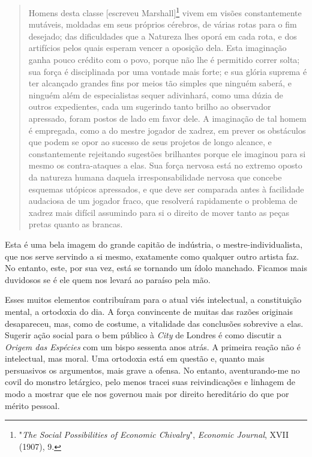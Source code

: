 \documentclass[12pt]{article}
\begin{document}
\begin{quote}
Homens desta classe [escreveu Marshall]\footnote{"\textit{The Social Possibilities of Economic Chivalry}", \textit{Economic Journal}, XVII (1907), 9.} vivem em visões constantemente mutáveis, moldadas em seus próprios cérebros, de várias rotas para o fim desejado; das dificuldades que a Natureza lhes oporá em cada rota, e dos artifícios pelos quais esperam vencer a oposição dela. Esta imaginação ganha pouco crédito com o povo, porque não lhe é permitido correr solta; sua força é disciplinada por uma vontade mais forte; e sua glória suprema é ter alcançado grandes fins por meios tão simples que ninguém saberá, e ninguém além de especialistas sequer adivinhará, como uma dúzia de outros expedientes, cada um sugerindo tanto brilho ao observador apressado, foram postos de lado em favor dele. A imaginação de tal homem é empregada, como a do mestre jogador de xadrez, em prever os obstáculos que podem se opor ao sucesso de seus projetos de longo alcance, e constantemente rejeitando sugestões brilhantes porque ele imaginou para si mesmo os contra-ataques a elas. Sua força nervosa está no extremo oposto da natureza humana daquela irresponsabilidade nervosa que concebe esquemas utópicos apressados, e que deve ser comparada antes à facilidade audaciosa de um jogador fraco, que resolverá rapidamente o problema de xadrez mais difícil assumindo para si o direito de mover tanto as peças pretas quanto as brancas.
\end{quote}

Esta é uma bela imagem do grande capitão de indústria, o mestre-individualista, que nos serve servindo a si mesmo, exatamente como qualquer outro artista faz. No entanto, este, por sua vez, está se tornando um ídolo manchado. Ficamos mais duvidosos se é ele quem nos levará ao paraíso pela mão.

Esses muitos elementos contribuíram para o atual viés intelectual, a constituição mental, a ortodoxia do dia. A força convincente de muitas das razões originais desapareceu, mas, como de costume, a vitalidade das conclusões sobrevive a elas. Sugerir ação social para o bem público à \textit{City} de Londres é como discutir a \textit{Origem das Espécies} com um bispo sessenta anos atrás. A primeira reação não é intelectual, mas moral. Uma ortodoxia está em questão e, quanto mais persuasivos os argumentos, mais grave a ofensa. No entanto, aventurando-me no covil do monstro letárgico, pelo menos tracei suas reivindicações e linhagem de modo a mostrar que ele nos governou mais por direito hereditário do que por mérito pessoal.
\end{document}
